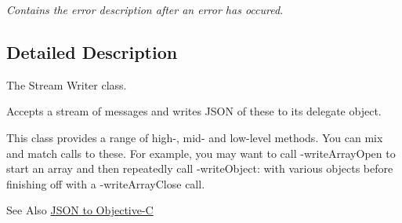 \begin{DoxyCompactItemize}
\begin{DoxyCompactList}\small\item\em Contains the error description after an error has occured. \end{DoxyCompactList}\end{DoxyCompactItemize}


\subsection{Detailed Description}
The Stream Writer class. 

Accepts a stream of messages and writes J\-S\-O\-N of these to its delegate object.

This class provides a range of high-\/, mid-\/ and low-\/level methods. You can mix and match calls to these. For example, you may want to call -\/write\-Array\-Open to start an array and then repeatedly call -\/write\-Object\-: with various objects before finishing off with a -\/write\-Array\-Close call.

\begin{DoxySeeAlso}{See Also}
\hyperlink{json2objc}{J\-S\-O\-N to Objective-\/\-C} 
\end{DoxySeeAlso}


